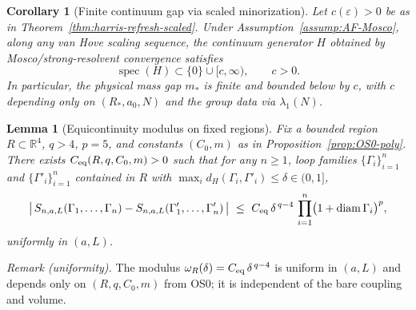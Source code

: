 \documentclass[11pt]{amsart}
\theoremstyle{plain}
\newtheorem{lemma}[theorem]{Lemma}
\newtheorem{corollary}[theorem]{Corollary}
\theoremstyle{definition}
\theoremstyle{remark}
\begin{document}
\begin{corollary}[Finite continuum gap via scaled minorization]\label{cor:scaled-continuum-gap}
Let $c(\varepsilon)>0$ be as in Theorem~\ref{thm:harris-refresh-scaled}. Under Assumption~\ref{assump:AF-Mosco}, along any van Hove scaling sequence, the continuum generator $H$ obtained by Mosco/strong-resolvent convergence satisfies
\[
  \operatorname{spec}(H)\subset\{0\}\cup[c,\infty),\qquad c>0.
\]
In particular, the physical mass gap $m_*$ is finite and bounded below by $c$, with $c$ depending only on $(R_*,a_0,N)$ and the group data via $\lambda_1(N)$.
\end{corollary}

\medskip
\begin{lemma}[Equicontinuity modulus on fixed regions]\label{lem:eqc-modulus}
Fix a bounded region $R\subset\mathbb R^4$, $q>4$, $p=5$, and constants $(C_0,m)$ as in Proposition~\ref{prop:OS0-poly}. There exists $C_{\rm eq}(R,q,C_0,m)>0$ such that for any $n\ge 1$, loop families $\{\Gamma_i\}_{i=1}^n$ and $\{\Gamma'_i\}_{i=1}^n$ contained in $R$ with $\max_i d_H(\Gamma_i,\Gamma'_i)\le \delta\in(0,1]$,
\[
  \big|\,S_{n,a,L}(\Gamma_1,\dots,\Gamma_n) - S_{n,a,L}(\Gamma'_1,\dots,\Gamma'_n)\,\big|
  \ \le\ C_{\rm eq}\,\delta^{\,q-4}\,\prod_{i=1}^n \bigl(1+\operatorname{diam}\Gamma_i\bigr)^p,
\]
uniformly in $(a,L)$.
\end{lemma}

\noindent\emph{Remark (uniformity).} The modulus $\omega_R(\delta)=C_{\rm eq}\,\delta^{\,q-4}$ is uniform in $(a,L)$ and depends only on $(R,q,C_0,m)$ from OS0; it is independent of the bare coupling and volume.
\end{document}
